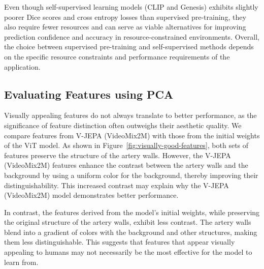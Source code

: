 \documentclass[a4paper,11pt,oneside]{report}
\begin{document}
Even though self-supervised learning models (CLIP and Genesis) exhibits slightly poorer Dice scores and cross entropy losses than supervised pre-training, they also require fewer resources and can serve as viable alternatives for improving prediction confidence and accuracy in resource-constrained environments. Overall, the choice between supervised pre-training and self-supervised methods depends on the specific resource constraints and performance requirements of the application.

\subsection{Evaluating Features using PCA}
Visually appealing features do not always translate to better performance, as the significance of feature distinction often outweighs their aesthetic quality. We compare features from V-JEPA (VideoMix2M) with those from the initial weights of the ViT model. As shown in Figure~\ref{fig:visually-good-features}, both sets of features preserve the structure of the artery walls. However, the V-JEPA (VideoMix2M) features enhance the contrast between the artery walls and the background by using a uniform color for the background, thereby improving their distinguishability. This increased contrast may explain why the V-JEPA (VideoMix2M) model demonstrates better performance. 

In contrast, the features derived from the model's initial weights, while preserving the original structure of the artery walls, exhibit less contrast. The artery walls blend into a gradient of colors with the background and other structures, making them less distinguishable. This suggests that features that appear visually appealing to humans may not necessarily be the most effective for the model to learn from.
\end{document}
